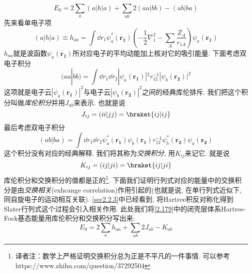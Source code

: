 \begin{equation}
\label{2.179}
E_0 = 2 \sum_{a}(a|h|a) + \sum_{ab}2(aa|bb) - (ab|ba)
\end{equation}
先来看单电子项
\begin{equation}
(a|h|a) \equiv h_{aa} = \int\dd{r_1}\psi_a^*(\mathbf{r_1})\left( -\frac{1}{2}\nabla_1^2 - \sum_A\frac{Z_A}{r_{1A}} \right)\psi_a(\mathbf{r_1})
\end{equation}
$h_{aa}$就是波函数$\psi_a(\mathbf{r_1})$所对应电子的平均动能加上核对它的吸引能量. 下面考虑双电子积分
\begin{equation}
(aa|bb) = \int\dd{r_1}\dd{r_2}|\psi_a(\mathbf{r_1})|^2r_{12}^{-1}|\psi_b(\mathbf{r_2})|^2
\end{equation}
这项就是电子云$|\psi_a(\mathbf{r_1})|^2$与电子云$|\psi_b(\mathbf{r_2})|^2$之间的经典库伦排斥. 
我们把这个积分叫做\emph{库伦积分}并用$J_{ab}$来表示. 
也就是说
\begin{equation}
J_{ij} = (ii|jj) = \braket{ij|ij}
\end{equation} 
最后考虑双电子积分
\begin{equation}
(ab|ba) = \int\dd{r_1}\dd{r_2} \psi_a^*(\mathbf{r_1})\psi_b(\mathbf{r_1}) r_{12}^{-1} \psi_b^*(\mathbf{r_2}) \psi_a(\mathbf{r_2})
\end{equation}
这个积分没有对应的经典解释. 
我们将其称为\emph{交换积分}, 
用$K_{ij}$来记它. 
就是说
\begin{equation}
K_{ij} = (ij|ji) = \braket{ij|ji}
\end{equation}
库伦积分和交换积分的值都是正的\footnote{译者注：数学上严格证明交换积分总为正是不平凡的一件事情. 可以参考 https://www.zhihu.com/question/37292504}. 
下面我们证明行列式对应的能量中的交换积分是由\emph{交换相关}(exhcange correlation)作用引起的(也就是说,
在单行列式近似下, 
同自旋电子的运动相互关联). 
\autoref{sec2.2.3}中已经看到, 
将Hartree积反对称化得到Slater行列式这个过程会引入相关作用. 
此处我们将\autoref{2.179}中的闭壳层体系Hartree-Fock基态能量用库伦积分和交换积分写出来:
\begin{equation}
E_0 = 2\sum_a h_{aa} + \sum_{ab}2J_{ab} - K_{ab} 
\end{equation}

